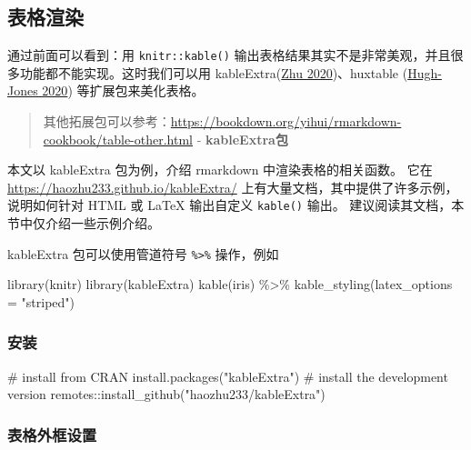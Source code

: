 \documentclass[
]{book}
\newenvironment{Shaded}{\begin{snugshade}}{\end{snugshade}}
\newcommand{\FunctionTok}[1]{\textcolor[rgb]{0.00,0.00,0.00}{#1}}
\newcommand{\NormalTok}[1]{#1}
\begin{document}
\hypertarget{ux8868ux683cux6e32ux67d3}{%
\subsection{表格渲染}\label{ux8868ux683cux6e32ux67d3}}

通过前面可以看到：用 \texttt{knitr::kable()}
输出表格结果其实不是非常美观，并且很多功能都不能实现。这时我们可以用
kableExtra(\href{https://bookdown.org/yihui/rmarkdown-cookbook/kableextra.html\#ref-R-kableExtra}{Zhu
2020})、huxtable
(\href{https://bookdown.org/yihui/rmarkdown-cookbook/table-other.html\#ref-R-huxtable}{Hugh-Jones
2020})
等扩展包来美化表格。

\begin{quote}
其他拓展包可以参考：\url{https://bookdown.org/yihui/rmarkdown-cookbook/table-other.html} -
\textbf{kableExtra包}
\end{quote}

本文以 kableExtra 包为例，介绍 rmarkdown 中渲染表格的相关函数。 它在
\url{https://haozhu233.github.io/kableExtra/}
上有大量文档，其中提供了许多示例，说明如何针对 HTML 或 LaTeX 输出自定义
\texttt{kable()} 输出。 建议阅读其文档，本节中仅介绍一些示例介绍。

kableExtra 包可以使用管道符号 \texttt{\%\textgreater{}\%} 操作，例如

\begin{Shaded}
\begin{Highlighting}[]
\NormalTok{library(knitr)}
\NormalTok{library(kableExtra)}
\NormalTok{kable(iris) \%\textgreater{}\%}
\NormalTok{  kable\_styling(latex\_options = "striped")}
\end{Highlighting}
\end{Shaded}

\hypertarget{ux5b89ux88c5-1}{%
\subsubsection{安装}\label{ux5b89ux88c5-1}}

\begin{Shaded}
\begin{Highlighting}[]
\FunctionTok{\# install from CRAN}
\NormalTok{install.packages("kableExtra")}
\FunctionTok{\# install the development version}
\NormalTok{remotes::install\_github("haozhu233/kableExtra")}
\end{Highlighting}
\end{Shaded}

\hypertarget{ux8868ux683cux5916ux6846ux8bbeux7f6e}{%
\subsubsection{表格外框设置}\label{ux8868ux683cux5916ux6846ux8bbeux7f6e}}
\end{document}
